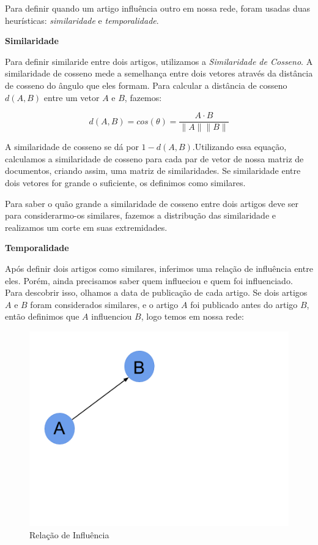 \documentclass[a4paper,12pt]{article}
\begin{document}
 Para definir quando um artigo influência outro em nossa rede, foram usadas duas heurísticas: \textit{similaridade} e 
 \textit{temporalidade}.
 
 \begin{description}
  \item \textbf{Similaridade}
  
    Para definir similaride entre dois artigos, utilizamos a \textit{Similaridade de Cosseno}. A similaridade de cosseno mede a semelhança entre
    dois vetores através da distância de cosseno do ângulo que eles formam. Para calcular a distância de cosseno $d(A,B)$ entre um vetor $A$ e $B$, fazemos:
    
    $$ d(A,B) = cos(\theta) = \dfrac{A \cdot B}{\parallel A\parallel \parallel B \parallel} $$
    
    A similaridade de cosseno se dá por $1-d(A,B)$.Utilizando essa equação, calculamos a similaridade de cosseno para cada
    par de vetor de nossa matriz de documentos, criando assim, uma matriz de similaridades. Se similaridade entre dois vetores for 
    grande o suficiente, os definimos como similares. 
    
    Para saber o quão grande a similaridade de cosseno entre dois artigos deve ser para considerarmo-os similares, fazemos a
    distribução das similaridade e realizamos um corte em suas extremidades.
    
    
  \item \textbf{Temporalidade}
  
    Após definir dois artigos como similares, inferimos uma relação de influência entre eles. Porém, ainda precisamos saber quem influeciou e quem
    foi influenciado. Para descobrir isso, olhamos a data de publicação de cada artigo. Se dois artigos $A$ e $B$ foram considerados 
    similares, e o artigo $A$ foi publicado antes do artigo $B$, então definimos que $A$ influenciou $B$, logo temos em nossa rede:
    
    \begin{figure}[h]
      \centering
      \includegraphics[scale=0.2]{./rede2.png}
      \caption{Relação de Influência}
    \end{figure}


\end{description}
\end{document}
